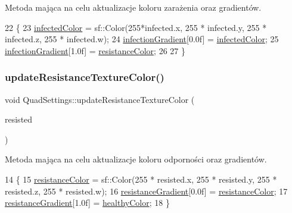 Metoda mająca na celu aktualizacje koloru zarażenia oraz gradientów. 
\begin{DoxyCode}
22 \{
23     \mbox{\hyperlink{class_quad_settings_a52c89695cb1f151b8007e9170dd18bbf}{infectedColor}} = sf::Color(255*infected.x, 255 * infected.y, 255 * infected.z, 255 * 
      infected.w);
24     \mbox{\hyperlink{class_quad_settings_a82277fca891d4180f4a5df5881943cc4}{infectionGradient}}[0.0f] = \mbox{\hyperlink{class_quad_settings_a52c89695cb1f151b8007e9170dd18bbf}{infectedColor}};
25     \mbox{\hyperlink{class_quad_settings_a82277fca891d4180f4a5df5881943cc4}{infectionGradient}}[1.0f] = \mbox{\hyperlink{class_quad_settings_a9d813ff930e92de96045aa982b99b177}{resistanceColor}};
26 
27 \}
\end{DoxyCode}
\mbox{\label{class_quad_settings_a75688efe96a7a34aa87600cccfe4a40d}} 
\subsubsection{\texorpdfstring{update\+Resistance\+Texture\+Color()}{updateResistanceTextureColor()}}
{\footnotesize\ttfamily void Quad\+Settings\+::update\+Resistance\+Texture\+Color (\begin{DoxyParamCaption}\item[{Im\+Vec4}]{resisted }\end{DoxyParamCaption})}

Metoda mająca na celu aktualizacje koloru odporności oraz gradientów. 
\begin{DoxyCode}
14 \{
15     \mbox{\hyperlink{class_quad_settings_a9d813ff930e92de96045aa982b99b177}{resistanceColor}} = sf::Color(255 * resisted.x, 255 * resisted.y, 255 * resisted.z, 255 * 
      resisted.w);
16     \mbox{\hyperlink{class_quad_settings_ac6dde1c3756bc222b42b68d8cb1beba0}{resistanceGradient}}[0.0f] = \mbox{\hyperlink{class_quad_settings_a9d813ff930e92de96045aa982b99b177}{resistanceColor}};
17     \mbox{\hyperlink{class_quad_settings_ac6dde1c3756bc222b42b68d8cb1beba0}{resistanceGradient}}[1.0f] = \mbox{\hyperlink{class_quad_settings_ad170bfeb3a4bc5157107cc07eba36067}{healthyColor}};
18 \}
\end{DoxyCode}
\mbox{\label{class_quad_settings_a05e0e32535731778852480ab4c993cce}} 
